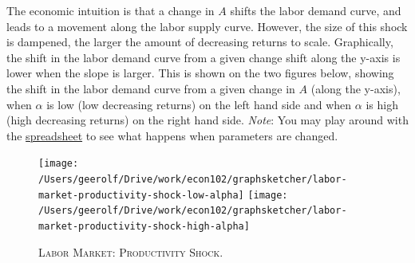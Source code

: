 \documentclass[]{book}
\begin{document}
\begin{enumerate}
  The economic intuition is that a change in \(A\) shifts the labor
  demand curve, and leads to a movement along the labor supply curve.
  However, the size of this shock is dampened, the larger the amount of
  decreasing returns to scale. Graphically, the shift in the labor
  demand curve from a given change shift along the y-axis is lower when
  the slope is larger. This is shown on the two figures below, showing
  the shift in the labor demand curve from a given change in \(A\)
  (along the y-axis), when \(\alpha\) is low (low decreasing returns) on
  the left hand side and when \(\alpha\) is high (high decreasing
  returns) on the right hand side. \emph{Note}: You may play around with
  the
  \href{https://docs.google.com/spreadsheets/d/1h9JJD8K2_IE166gdj78waf0zu4YDY9Rp3r5oiJR_06s/edit?usp=sharing}{spreadsheet}
  to see what happens when parameters are changed.
\end{enumerate}



\begin{figure}

{\centering \texttt{[image: /Users/geerolf/Drive/work/econ102/graphsketcher/labor-market-productivity-shock-low-alpha]} \texttt{[image: /Users/geerolf/Drive/work/econ102/graphsketcher/labor-market-productivity-shock-high-alpha]} 

}

\caption{\textsc{Labor Market: Productivity Shock}.}\label{fig:labor-market-prod-shock}
\end{figure}
\end{document}
